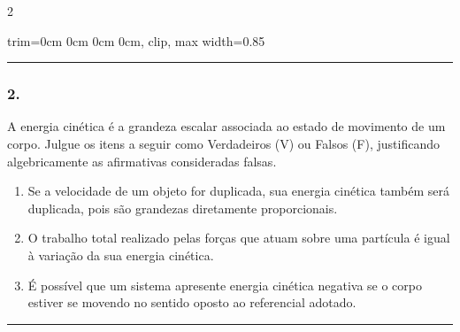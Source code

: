 \documentclass[twoside, 10pt, a4paper]{article}
\newlength{\espacoPreQuestao}\setlength{\espacoPreQuestao}{0.1cm}
\newlength{\espacoQuestao}\setlength{\espacoQuestao}{0.2cm}
\newlength{\espacoAlt}\setlength{\espacoAlt}{0.2cm}
\newcommand{\larguraTikz}{0.85\linewidth}
\begin{document}
\begin{multicols*}{2}
\begin{center}
\begin{adjustbox}{trim=0cm 0cm 0cm 0cm, clip, max width=\larguraTikz}
\end{adjustbox}
\end{center}
\par\vspace{\espacoQuestao}

\noindent\textcolor{CorLinha}{\rule{\linewidth}{0.5pt}} 
\par\vspace{\espacoPreQuestao}
\subsubsection*{2.} A energia cinética é a grandeza escalar associada ao estado de movimento de um corpo. Julgue os itens a seguir como Verdadeiros (V) ou Falsos (F), justificando algebricamente as afirmativas consideradas falsas.
\begin{enumerate}[label=\Roman*., itemsep=\espacoAlt]
    \item Se a velocidade de um objeto for duplicada, sua energia cinética também será duplicada, pois são grandezas diretamente proporcionais.
    \item O trabalho total realizado pelas forças que atuam sobre uma partícula é igual à variação da sua energia cinética.
    \item É possível que um sistema apresente energia cinética negativa se o corpo estiver se movendo no sentido oposto ao referencial adotado.
\end{enumerate}
\par\vspace{\espacoQuestao}

\noindent\textcolor{CorLinha}{\rule{\linewidth}{0.5pt}} 
\par\vspace{\espacoPreQuestao}

\end{multicols*}
\end{document}
